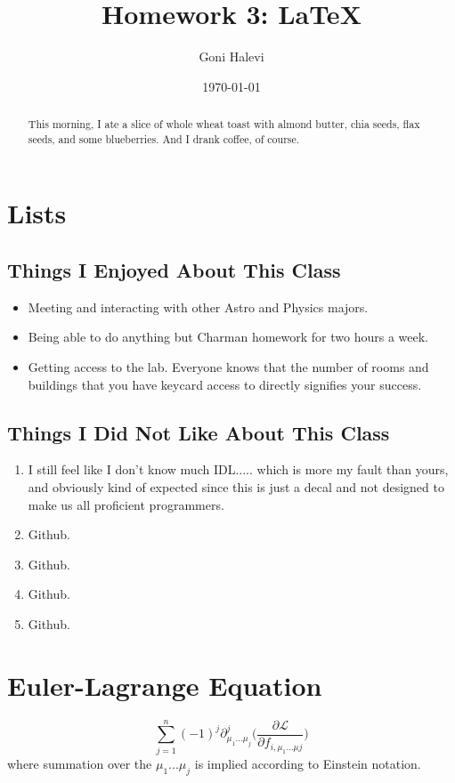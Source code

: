 \documentclass[a4paper]{article}
\title{Homework 3: \LaTeX{}}
\author{Goni Halevi}
\date{\today}
\begin{document}
\maketitle

\begin{abstract}
This morning, I ate a slice of whole wheat toast with almond butter, chia seeds, flax seeds, and some blueberries. And I drank coffee, of course.
\end{abstract}

\section{Lists}

\subsection{Things I Enjoyed About This Class}

\begin{itemize}
  \item Meeting and interacting with other Astro and Physics majors.
    \item Being able to do anything but Charman homework for two hours a week.
    \item Getting access to the lab. Everyone knows that the number of rooms and buildings that you have keycard access to directly signifies your success.
\end{itemize}

\subsection{Things I Did Not Like About This Class}

\begin{enumerate}
  \item I still feel like I don't know much IDL..... which is more my fault than yours, and obviously kind of expected since this is just a decal and not designed to make us all proficient programmers.
    \item Github.
    \item Github.
    \item Github.
    \item Github.
\end{enumerate}

\section{Euler-Lagrange Equation}
$$\sum_{j=1}^{n} (-1)^j\partial^j_{\mu_{1}...\mu_{j}}\bigg(\frac{\partial\mathcal{L}}{\partial f_{i,\mu_{1}...\mu{j}}}\bigg) $$
where summation over the \(\mu_{1}...\mu_{j}\) is implied according to Einstein notation.
\end{document}
